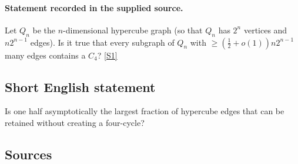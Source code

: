 \documentclass[11pt,a4paper]{article}
\newcommand{\sref}[2]{\hyperlink{source:#1:#2}{[S#2]}}
\begin{document}
\paragraph{Statement recorded in the supplied source.}
Let $Q_n$ be the $n$-dimensional hypercube graph (so that $Q_n$ has $2^n$ vertices and $n2^{n-1}$ edges). Is it true that every subgraph of $Q_n$ with $ \geq \left(\frac{1}{2}+o(1)\right)n2^{n-1} $ many edges contains a $C_4$? \sref{1920}{1}

\subsection{Short English statement}

Is one half asymptotically the largest fraction of hypercube edges that can be retained without creating a four-cycle?

\subsection{Sources}
\end{document}
